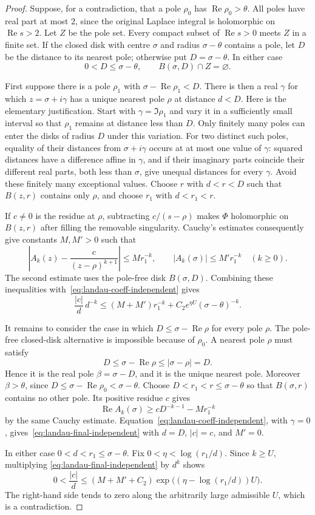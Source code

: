 \documentclass[11pt,a4paper]{article}
\theoremstyle{remark}
\DeclareMathOperator{\Rea}{Re}
\begin{document}
\begin{proof}
Suppose, for a contradiction, that a pole $\rho_0$ has
$\Rea\rho_0>\theta$. All poles have real part at most $2$, since the
original Laplace integral is holomorphic on $\Rea s>2$.
Let $Z$ be the pole set. Every compact subset of $\Rea s>0$ meets $Z$
in a finite set. If the closed disk with centre $\sigma$ and radius
$\sigma-\theta$ contains a pole, let $D$ be the distance to its nearest
pole; otherwise put $D=\sigma-\theta$. In either case
\[
 0<D\le\sigma-\theta,
 \qquad B(\sigma,D)\cap Z=\varnothing.
\]

First suppose there is a pole $\rho_1$ with
$\sigma-\Rea\rho_1<D$. There is then a real $\gamma$ for which
$z=\sigma+i\gamma$ has a unique nearest pole $\rho$ at distance $d<D$.
Here is the elementary justification. Start with
$\gamma=\Im\rho_1$ and vary it in a sufficiently small interval so
that $\rho_1$ remains at distance less than $D$. Only finitely many
poles can enter the disks of radius $D$ under this variation. For two
distinct such poles, equality of their distances from
$\sigma+i\gamma$ occurs at at most one value of $\gamma$: squared
distances have a difference affine in $\gamma$, and if their imaginary
parts coincide their different real parts, both less than $\sigma$,
give unequal distances for every $\gamma$. Avoid these finitely many
exceptional values. Choose $r$ with $d<r<D$ such that $B(z,r)$ contains
only $\rho$, and choose $r_1$ with $d<r_1<r$.

If $c\ne0$ is the residue at $\rho$, subtracting $c/(s-\rho)$ makes
$\Phi$ holomorphic on $B(z,r)$ after filling the removable singularity.
Cauchy's estimates consequently give constants $M,M'>0$ such that
\[
 \left|A_k(z)-\frac{c}{(z-\rho)^{k+1}}\right|\le Mr_1^{-k},
 \qquad |A_k(\sigma)|\le M'r_1^{-k}
 \quad(k\ge0).
\]
The second estimate uses the pole-free disk $B(\sigma,D)$.
Combining these inequalities with~\eqref{eq:landau-coeff-independent}
gives
\begin{equation}\label{eq:landau-final-independent}
 \frac{|c|}{d}\,d^{-k}
 \le (M+M')r_1^{-k}
       +C_2e^{\eta U}(\sigma-\theta)^{-k}.
\end{equation}

It remains to consider the case in which
$D\le\sigma-\Rea\rho$ for every pole $\rho$.
The pole-free closed-disk alternative is impossible because of
$\rho_0$. A nearest pole $\rho$ must satisfy
\[
 D\le\sigma-\Rea\rho\le|\sigma-\rho|=D.
\]
Hence it is the real pole $\beta=\sigma-D$, and it is the unique nearest
pole. Moreover $\beta>\theta$, since
$D\le\sigma-\Rea\rho_0<\sigma-\theta$.
Choose $D<r_1<r\le\sigma-\theta$ so that $B(\sigma,r)$ contains no
other pole. Its positive residue $c$ gives
\[
 \Rea A_k(\sigma)\ge cD^{-k-1}-Mr_1^{-k}
\]
by the same Cauchy estimate. Equation~\eqref{eq:landau-coeff-independent},
with $\gamma=0$, gives~\eqref{eq:landau-final-independent} with
$d=D$, $|c|=c$, and $M'=0$.

In either case $0<d<r_1\le\sigma-\theta$. Fix
$0<\eta<\log(r_1/d)$. Since $k\ge U$, multiplying
\eqref{eq:landau-final-independent} by $d^k$ shows
\[
 0<\frac{|c|}{d}
 \le (M+M'+C_2)
      \exp\bigl((\eta-\log(r_1/d))U\bigr).
\]
The right-hand side tends to zero along the arbitrarily large admissible
$U$, which is a contradiction.
\end{proof}
\end{document}
